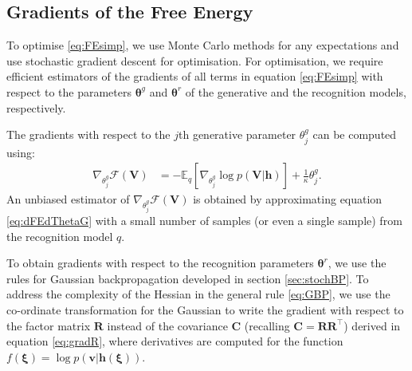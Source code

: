 \documentclass{article}
\newcommand{\E}{\mathbb{E}} %
\newcommand{\FE}{\mathcal{F}} %
\newcommand{\hid}{\ensuremath{\mathbf{h}}} %
\newcommand{\vis}{\ensuremath{\mathbf{v}}} %
\newcommand{\myvec}[1]{\mbox{$\mathbf{#1}$}}
\newcommand{\myvecsym}[1]{\mbox{$\boldsymbol{#1}$}}
\newcommand{\vtheta}{\mbox{$\myvecsym{\theta}$}}
\newcommand{\vxi}{\mbox{$\myvecsym{\xi}$}}
\newcommand{\vC}{\mbox{$\myvec{C}$}}
\newcommand{\vR}{\mbox{$\myvec{R}$}}
\newcommand{\vV}{\mbox{$\myvec{V}$}}
\begin{document}
\begin{bibunit}[icml2013]
%
\vspace{-2mm}
\subsection{Gradients of the Free Energy}
To optimise \eqref{eq:FEsimp}, we use Monte Carlo methods for any expectations and use stochastic 
gradient descent for optimisation. For optimisation, we  require efficient estimators of the gradients 
of all 
terms in equation \eqref{eq:FEsimp} with respect to the parameters $\vtheta^g$ and $\vtheta^r$
of the generative  and the recognition models, respectively.

The gradients with respect to the $j$th generative parameter $\theta_j^g$  can 
be computed using:
\vspace{-2mm}
\begin{align}
\nabla_{ \theta_j^g } \FE (\vV)  &= -  \E_{q} \left[ \nabla_{\theta_j^g} \log 
p(\vV| \hid ) 
\right] +\tfrac{1}{\kappa}  \theta_j^g. \label{eq:dFEdThetaG}
\end{align}
An unbiased estimator of $\nabla_{ \theta_j^g } \FE (\vV)$ is obtained by 
approximating equation \eqref{eq:dFEdThetaG} with a small number of samples 
(or 
even a single sample)
from the recognition model $q$.

To obtain gradients with respect to the recognition parameters $\vtheta^r$, 
we use the rules for Gaussian backpropagation developed in section 
\ref{sec:stochBP}. To address the complexity of the Hessian in the general 
rule 
\eqref{eq:GBP}, we use the co-ordinate transformation for the Gaussian to 
write the gradient with respect to the factor matrix $\vR$ instead of the 
covariance $\vC$ (recalling $\vC = \vR \vR^\top$) derived in equation 
\eqref{eq:gradR}, where derivatives are computed for the function $f(\vxi) = \log p(\vis| \hid(\vxi))$.


\end{bibunit}
\end{document}
